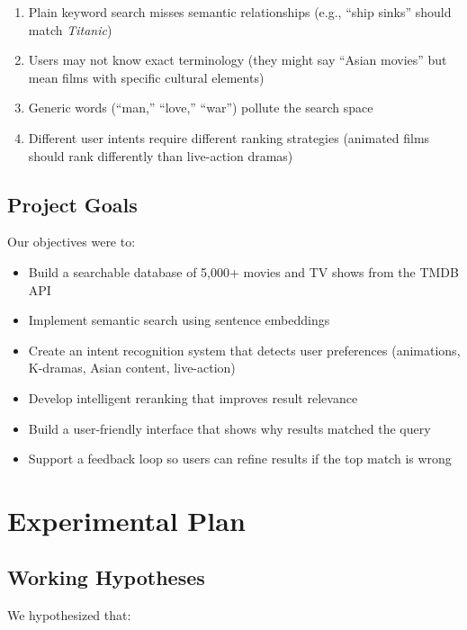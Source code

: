 \documentclass[11pt,a4paper]{article}
\begin{document}
\begin{enumerate}
    \item Plain keyword search misses semantic relationships (e.g., ``ship sinks'' should match \textit{Titanic})
    \item Users may not know exact terminology (they might say ``Asian movies'' but mean films with specific cultural elements)
    \item Generic words (``man,'' ``love,'' ``war'') pollute the search space
    \item Different user intents require different ranking strategies (animated films should rank differently than live-action dramas)
\end{enumerate}

\subsection{Project Goals}

Our objectives were to:

\begin{itemize}
    \item Build a searchable database of 5,000+ movies and TV shows from the TMDB API
    \item Implement semantic search using sentence embeddings
    \item Create an intent recognition system that detects user preferences (animations, K-dramas, Asian content, live-action)
    \item Develop intelligent reranking that improves result relevance
    \item Build a user-friendly interface that shows why results matched the query
    \item Support a feedback loop so users can refine results if the top match is wrong
\end{itemize}

\section{Experimental Plan}

\subsection{Working Hypotheses}

We hypothesized that:
\end{document}
